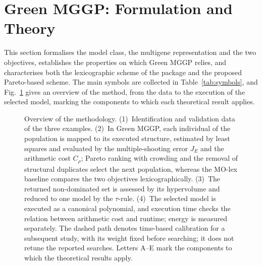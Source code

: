 \section{Green MGGP: Formulation and Theory}\label{sec:method}

This section formalises the model class, the multigene representation and the two objectives, establishes the
properties on which Green MGGP relies, and characterises both the lexicographic scheme of the package and the
proposed Pareto-based scheme. The main symbols are collected in Table~\ref{tab:symbols}, and
Fig.~\ref{fig:pipeline} gives an overview of the method, from the data to the execution of the selected model,
marking the components to which each theoretical result applies.

\begin{figure}[t]
\centering
\resizebox{\textwidth}{!}{}
\caption{Overview of the methodology. (1)~Identification and validation data of the three examples. (2)~In Green
MGGP, each individual of the population is mapped to its executed structure, estimated by least squares and evaluated
by the multiple-shooting error $J_E$ and the arithmetic cost $C_\rho$; Pareto ranking with crowding and the removal of
structural duplicates select the next population, whereas the MO-lex baseline compares the two objectives
lexicographically. (3)~The returned non-dominated set is assessed by its hypervolume and reduced to one model by the
$\tau$-rule. (4)~The selected model is executed as a canonical polynomial, and execution time checks the relation between arithmetic cost and runtime; energy is measured separately. The dashed path denotes time-based calibration for a subsequent study, with its weight fixed before searching; it does not retune the reported searches. Letters A--E mark the components to which the theoretical results
apply.}
\label{fig:pipeline}
\end{figure}

